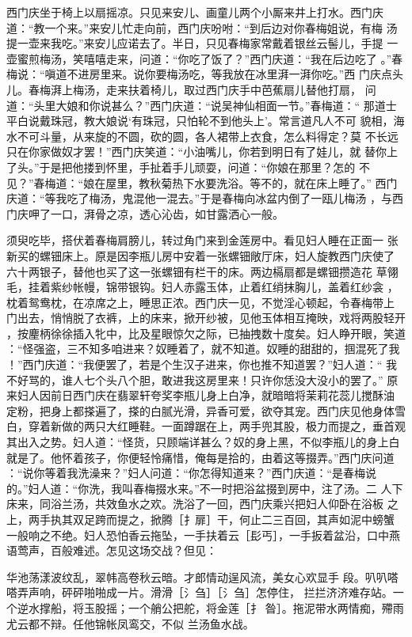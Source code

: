 西门庆坐于椅上以扇摇凉。只见来安儿、画童儿两个小厮来井上打水。西门庆
道：“教一个来。”来安儿忙走向前，西门庆吩咐：“到后边对你春梅姐说，有梅
汤提一壶来我吃。”来安儿应诺去了。半日，只见春梅家常戴着银丝云髻儿，手提
一壶蜜煎梅汤，笑嘻嘻走来，问道：“你吃了饭了？”西门庆道：“我在后边吃了
。”春梅说：“嗔道不进房里来。说你要梅汤吃，等我放在冰里湃一湃你吃。”西
门庆点头儿。春梅湃上梅汤，走来扶着椅儿，取过西门庆手中芭蕉扇儿替他打扇，
问道：“头里大娘和你说甚么？”西门庆道：“说吴神仙相面一节。”春梅道：“
那道士平白说戴珠冠，教大娘说‘有珠冠，只怕轮不到他头上’。常言道凡人不可
貌相，海水不可斗量，从来旋的不圆，砍的圆，各人裙带上衣食，怎么料得定？莫
不长远只在你家做奴才罢！”西门庆笑道：“小油嘴儿，你若到明日有了娃儿，就
替你上了头。”于是把他搂到怀里，手扯着手儿顽耍，问道：“你娘在那里？怎的
不见？”春梅道：“娘在屋里，教秋菊热下水要洗浴。等不的，就在床上睡了。”
西门庆道：“等我吃了梅汤，鬼混他一混去。”于是春梅向冰盆内倒了一瓯儿梅汤
，与西门庆呷了一口，湃骨之凉，透心沁齿，如甘露洒心一般。

须臾吃毕，搭伏着春梅肩膀儿，转过角门来到金莲房中。看见妇人睡在正面一
张新买的螺钿床上。原是因李瓶儿房中安着一张螺钿敞厅床，妇人旋教西门庆使了
六十两银子，替他也买了这一张螺钿有栏干的床。两边槅扇都是螺钿攒造花
草翎毛，挂着紫纱帐幔，锦带银钩。妇人赤露玉体，止着红绡抹胸儿，盖着红纱衾
，枕着鸳鸯枕，在凉席之上，睡思正浓。西门庆一见，不觉淫心顿起，令春梅带上
门出去，悄悄脱了衣裤，上的床来，掀开纱被，见他玉体相互掩映，戏将两股轻开
，按麈柄徐徐插入牝中，比及星眼惊欠之际，已抽拽数十度矣。妇人睁开眼，笑道
：“怪强盗，三不知多咱进来？奴睡着了，就不知道。奴睡的甜甜的，掴混死了我
！”西门庆道：“我便罢了，若是个生汉子进来，你也推不知道罢？”妇人道：“
我不好骂的，谁人七个头八个胆，敢进我这房里来！只许你恁没大没小的罢了。”
原来妇人因前日西门庆在翡翠轩夸奖李瓶儿身上白净，就暗暗将茉莉花蕊儿搅酥油
定粉，把身上都搽遍了，搽的白腻光滑，异香可爱，欲夺其宠。西门庆见他身体雪
白，穿着新做的两只大红睡鞋。一面蹲踞在上，两手兜其股，极力而提之，垂首观
其出入之势。妇人道：“怪货，只顾端详甚么？奴的身上黑，不似李瓶儿的身上白
就是了。他怀着孩子，你便轻怜痛惜，俺每是拾的，由着这等掇弄。”西门庆问道
：“说你等着我洗澡来？”妇人问道：“你怎得知道来？”西门庆道：“是春梅说
的。”妇人道：“你洗，我叫春梅掇水来。”不一时把浴盆掇到房中，注了汤。二
人下床来，同浴兰汤，共效鱼水之欢。洗浴了一回，西门庆乘兴把妇人仰卧在浴板
之上，两手执其双足跨而提之，掀腾［扌扉］干，何止二三百回，其声如泥中螃蟹
一般响之不绝。妇人恐怕香云拖坠，一手扶着云［髟丐］，一手扳着盆沿，口中燕
语莺声，百般难述。怎见这场交战？但见：

华池荡漾波纹乱，翠帏高卷秋云暗。才郎情动逞风流，美女心欢显手
段。叭叭嗒嗒弄声响，砰砰啪啪成一片。滑滑［氵刍］［氵刍］怎停住，
拦拦济济难存站。一个逆水撑船，将玉股摇；一个艄公把舵，将金莲［扌
昝］。拖泥带水两情痴，殢雨尤云都不辩。任他锦帐凤鸾交，不似
兰汤鱼水战。

